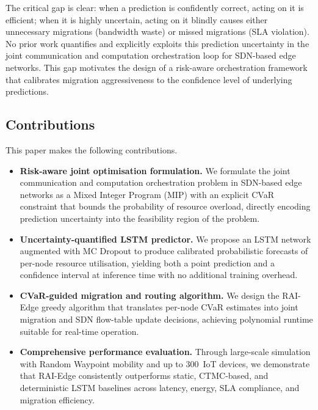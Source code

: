 \documentclass[conference]{IEEEtran}
\begin{document}
The critical gap is clear: when a prediction is confidently correct,
acting on it is efficient; when it is highly uncertain, acting on it
blindly causes either unnecessary migrations (bandwidth waste) or missed
migrations (SLA violation). No prior work quantifies and explicitly
exploits this prediction uncertainty in the joint communication and
computation orchestration loop for SDN-based edge networks. This gap
motivates the design of a risk-aware orchestration framework that
calibrates migration aggressiveness to the confidence level of
underlying predictions.

\subsection{Contributions}

This paper makes the following contributions.

\begin{itemize}

  \item \textbf{Risk-aware joint optimisation formulation.} We formulate
        the joint communication and computation orchestration problem in
        SDN-based edge networks as a Mixed Integer Program (MIP) with an
        explicit CVaR constraint that bounds the probability of resource
        overload, directly encoding prediction uncertainty into the
        feasibility region of the problem.

  \item \textbf{Uncertainty-quantified LSTM predictor.} We propose an
        LSTM network augmented with MC Dropout to produce calibrated
        probabilistic forecasts of per-node resource utilisation, yielding
        both a point prediction and a confidence interval at inference
        time with no additional training overhead.

  \item \textbf{CVaR-guided migration and routing algorithm.} We design
        the RAI-Edge greedy algorithm that translates per-node CVaR
        estimates into joint migration and SDN flow-table update decisions,
        achieving polynomial runtime suitable for real-time operation.

  \item \textbf{Comprehensive performance evaluation.} Through
        large-scale simulation with Random Waypoint mobility and up to
        300~IoT devices, we demonstrate that RAI-Edge consistently
        outperforms static, CTMC-based, and deterministic LSTM baselines
        across latency, energy, SLA compliance, and migration efficiency.

\end{itemize}
\end{document}
